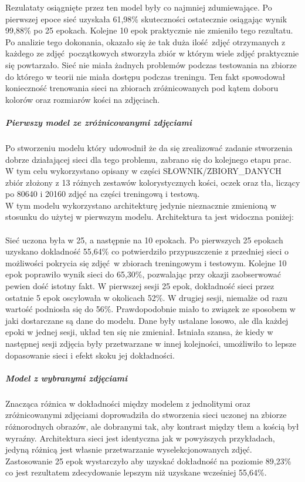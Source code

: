 Rezulataty osiągnięte przez ten model były co najmniej zdumiewające. Po pierwszej epoce
sieć uzyskała 61,98\% skuteczności ostatecznie osiągając wynik 99,88\% po 25 epokach.
Kolejne 10 epok praktycznie nie zmieniło tego rezultatu. \\
Po analizie tego dokonania, okazało się że tak duża ilość zdjęć otrzymanych
z każdego ze zdjęć początkowych stworzyła zbiór w którym wiele zdjęć praktycznie się
powtarzało. Sieć nie miała żadnych problemów podczas testowania na zbiorze
do którego w teorii nie miała dostępu podczas treningu. Ten fakt spowodował konieczność
trenowania sieci na zbiorach zróżnicowanych pod kątem doboru kolorów oraz rozmiarów
kości na zdjęciach.

\subparagraph{Pierwszy model ze zróżnicowanymi zdjęciami}
Po stworzeniu modelu który udowodnił że da się zrealizować zadanie stworzenia dobrze
działającej sieci dla tego problemu, zabrano się do kolejnego etapu prac. W tym celu
wykorzystano opisany w części SŁOWNIK/ZBIORY_DANYCH zbiór złożony z 13 różnych zestawów
kolorystycznych kości, oczek oraz tła, liczący po 80640 i 20160 zdjęć na części
treningową i testową. \\
W tym modelu wykorzystano architekturę jedynie nieznacznie zmienioną w stosunku do
użytej w pierwszym modelu. Architektura ta jest widoczna poniżej: \\\\

Sieć uczona była w 25, a następnie na 10 epokach.
Po pierwszych 25 epokach uzyskano dokladność 55,64\% co potwierdziło przypuszczenie
z przedniej sieci o możliwości pokrycia się zdjęć w zbiorach treningowym i testowym.
Kolejne 10 epok poprawiło wynik sieci do 65,30\%, pozwalając przy okazji zaobserwować
pewien dość istotny fakt. W pierwszej sesji 25 epok, dokładność sieci przez ostatnie
5 epok oscylowała w okolicach 52\%. W drugiej sesji, niemalże od razu wartość
podniosła się do 56\%. Prawdopodobnie miało to związek ze sposobem w jaki dostarczane
są dane do modelu. Dane były ustalane losowo, ale dla każdej epoki w jednej sesji,
układ ten się nie zmieniał. Istniała szansa, że kiedy w następnej sesji zdjęcia
były przetwarzane w innej kolejności, umożliwiło to lepsze dopasowanie sieci i efekt
skoku jej dokładności.

\subparagraph{Model z wybranymi zdjęciami}
Znacząca różnica w dokładności między modelem z jednolitymi oraz zróżnicowanymi zdjęciami
doprowadziła do stworzenia sieci uczonej na zbiorze różnorodnych obrazów, ale
dobranymi tak, aby kontrast między tłem a kością był wyraźny. Architektura sieci
jest identyczna jak w powyższych przykładach, jedyną różnicą jest własnie przetwarzanie
wyselekcjonowanych zdjęć. \\
Zastosowanie 25 epok wystarczyło aby uzyskać dokładność na poziomie 89,23\% co jest
rezultatem zdecydowanie lepszym niż uzyskane wcześniej 55,64\%.

